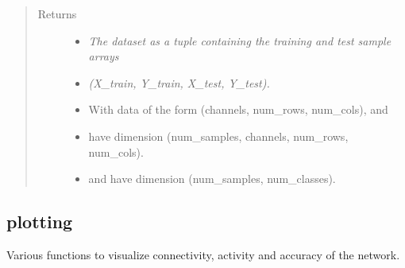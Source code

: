 \documentclass[letterpaper,10pt,english]{sphinxmanual}
\begin{document}
\begin{fulllineitems}
\begin{quote}
\begin{description}
\begin{itemize}
\end{itemize}

\item[{Returns}] \leavevmode
\begin{itemize}
\item {} 
\emph{The dataset as a tuple containing the training and test sample arrays}

\item {} 
\emph{(X\_train, Y\_train, X\_test, Y\_test).}

\item {} 
With data of the form (channels, num\_rows, num\_cols),  and

\item {} 
 have dimension (num\_samples, channels, num\_rows, num\_cols).

\item {} 
 and  have dimension (num\_samples, num\_classes).

\end{itemize}


\end{description}\end{quote}

\end{fulllineitems}


\begin{fulllineitems}
\label{snntoolbox.io_utils:snntoolbox.io_utils.facedetection_load.load_paths_from_files}
\end{fulllineitems}


\begin{fulllineitems}
\label{snntoolbox.io_utils:snntoolbox.io_utils.facedetection_load.load_samples}
\end{fulllineitems}



\subsection{plotting}
\label{snntoolbox.io_utils:plotting}\label{snntoolbox.io_utils:module-snntoolbox.io_utils.plotting}
Various functions to visualize connectivity, activity and accuracy of the
network.
\end{document}
